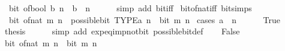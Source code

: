 \begin{isabellebody}
\ \ {\isacartoucheopen}bit\ {\isacharparenleft}{\kern0pt}of{\isacharunderscore}{\kern0pt}bool\ b{\isacharparenright}{\kern0pt}\ n\ {\isasymlongleftrightarrow}\ b\ {\isasymand}\ n\ {\isacharequal}{\kern0pt}\ {}{\isacartoucheclose}\isanewline
%
\isadelimproof
\ \ %
\endisadelimproof
%
\isatagproof
{}\isamarkupfalse%
\ {\isacharparenleft}{\kern0pt}simp\ add{\isacharcolon}{\kern0pt}\ bit{\isacharunderscore}{\kern0pt}{}{\isacharunderscore}{\kern0pt}iff{\isacharparenright}{\kern0pt}%
\endisatagproof
{\isafoldproof}%
%
\isadelimproof
\isanewline
%
\endisadelimproof
\isanewline
{}\isamarkupfalse%
\ bit{\isacharunderscore}{\kern0pt}of{\isacharunderscore}{\kern0pt}nat{\isacharunderscore}{\kern0pt}iff\ {\isacharbrackleft}{\kern0pt}bit{\isacharunderscore}{\kern0pt}simps{\isacharbrackright}{\kern0pt}{\isacharcolon}{\kern0pt}\isanewline
\ \ {\isacartoucheopen}bit\ {\isacharparenleft}{\kern0pt}of{\isacharunderscore}{\kern0pt}nat\ m{\isacharparenright}{\kern0pt}\ n\ {\isasymlongleftrightarrow}\ possible{\isacharunderscore}{\kern0pt}bit\ TYPE{\isacharparenleft}{\kern0pt}{\isacharprime}{\kern0pt}a{\isacharparenright}{\kern0pt}\ n\ {\isasymand}\ bit\ m\ n{\isacartoucheclose}\isanewline
%
\isadelimproof
%
\endisadelimproof
%
\isatagproof
{}\isamarkupfalse%
\ {\isacharparenleft}{\kern0pt}cases\ {\isacartoucheopen}{\isacharparenleft}{\kern0pt}{}{\isacharcolon}{\kern0pt}{\isacharcolon}{\kern0pt}{\isacharprime}{\kern0pt}a{\isacharparenright}{\kern0pt}\ {\isacharcircum}{\kern0pt}\ n\ {\isacharequal}{\kern0pt}\ {}{\isacartoucheclose}{\isacharparenright}{\kern0pt}\isanewline
\ \ \isamarkupfalse%
\ True\isanewline
\ \ \isamarkupfalse%
\ \isamarkupfalse%
\ {\isacharquery}{\kern0pt}thesis\isanewline
\ \ \ \ \isamarkupfalse%
\ {\isacharparenleft}{\kern0pt}simp\ add{\isacharcolon}{\kern0pt}\ exp{\isacharunderscore}{\kern0pt}eq{\isacharunderscore}{\kern0pt}{}{\isacharunderscore}{\kern0pt}imp{\isacharunderscore}{\kern0pt}not{\isacharunderscore}{\kern0pt}bit\ possible{\isacharunderscore}{\kern0pt}bit{\isacharunderscore}{\kern0pt}def{\isacharparenright}{\kern0pt}\isanewline
{}\isamarkupfalse%
\isanewline
\ \ \isamarkupfalse%
\ False\isanewline
\ \ \isamarkupfalse%
\ \isamarkupfalse%
\ {\isacartoucheopen}bit\ {\isacharparenleft}{\kern0pt}of{\isacharunderscore}{\kern0pt}nat\ m{\isacharparenright}{\kern0pt}\ n\ {\isasymlongleftrightarrow}\ bit\ m\ n{\isacartoucheclose}\isanewline

\end{isabellebody}
